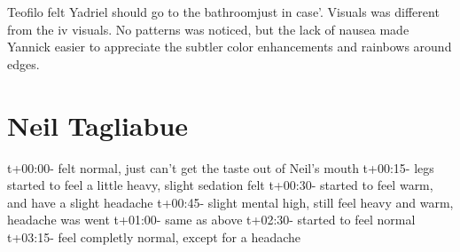 \documentclass[12pt]{book}
\begin{document}
Teofilo felt Yadriel should go to the bathroomjust in case'. Visuals was different from the iv visuals. No patterns was noticed, but the lack of nausea made Yannick easier to appreciate the subtler color enhancements and rainbows around edges.



\chapter{Neil Tagliabue}

t+00:00- felt normal, just can't get the taste out of Neil's mouth t+00:15- legs started to feel a little heavy, slight sedation felt t+00:30- started to feel warm, and have a slight headache t+00:45- slight mental high, still feel heavy and warm, headache was went t+01:00- same as above t+02:30- started to feel normal t+03:15- feel completly normal, except for a headache
\end{document}
